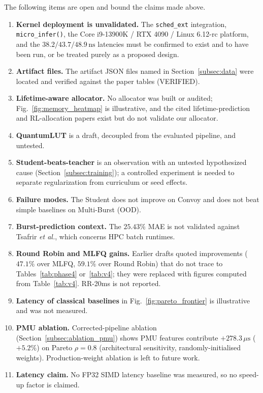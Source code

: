 The following items are open and bound the claims made above.
\begin{enumerate}
  \item \textbf{Kernel deployment is unvalidated.} The \texttt{sched\_ext}
    integration, \texttt{micro\_infer()}, the Core i9-13900K / RTX 4090 /
    Linux 6.12-rc platform, and the $38.2/43.7/48.9\,\text{ns}$
    latencies must be confirmed to exist and to have been run, or be treated
    purely as a proposed design.
  \item \textbf{Artifact files.} The artifact JSON files named in
    Section~\ref{subsec:data} were located and verified against the paper tables
    (VERIFIED).
  \item \textbf{Lifetime-aware allocator.} No allocator was built or audited;
    Fig.~\ref{fig:memory_heatmap} is illustrative, and the cited lifetime-prediction and RL-allocation papers exist but do not
    validate our allocator.
  \item \textbf{QuantumLUT} is a draft, decoupled from the evaluated pipeline,
    and untested.
  \item \textbf{Student-beats-teacher} is an observation with an untested
    hypothesized cause (Section~\ref{subsec:training}); a controlled experiment
    is needed to separate regularization from curriculum or seed effects.
  \item \textbf{Failure modes.} The Student does not improve on Convoy and does
    not beat simple baselines on Multi-Burst (OOD).
  \item \textbf{Burst-prediction context.} The $25.43\%$ MAE is not validated
    against Tsafrir \textit{et al.}, which concerns HPC batch runtimes.
  \item \textbf{Round Robin and MLFQ gains.} Earlier drafts quoted
    improvements ($47.1\%$ over MLFQ, $59.1\%$ over Round Robin) that do not
    trace to Tables~\ref{tab:phase4} or~\ref{tab:v4}; they were replaced with
    figures computed from Table~\ref{tab:v4}. RR-20ms is not reported.
  \item \textbf{Latency of classical baselines} in Fig.~\ref{fig:pareto_frontier}
    is illustrative and was not measured.
  \item \textbf{PMU ablation.} Corrected-pipeline ablation
    (Section~\ref{subsec:ablation_pmu}) shows PMU features contribute
    $+278.3\,\mu\text{s}$ ($+5.2\%$) on Pareto $\rho=0.8$ (architectural
    sensitivity, randomly-initialised weights). Production-weight ablation is
    left to future work.
  \item \textbf{Latency claim.} No FP32 SIMD latency baseline was measured, so
    no speed-up factor is claimed.
\end{enumerate}

